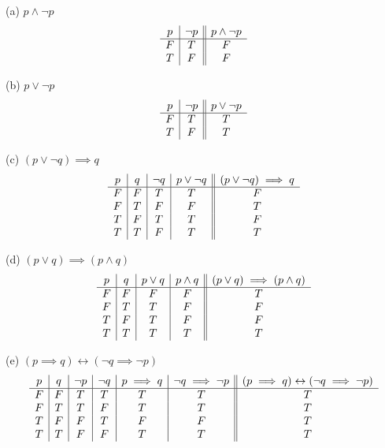 \documentclass[addpoints]{exam}
\begin{document}
\begin{questions}
    \question
    \begin{solution}

        (a) $ p \land \neg p $
        \[ 
        \begin{array}{c | c || c}
            p & \neg p & p \land \neg p \\ 
            \hline
            F & T & F \\ 
            T & F & F
        \end{array}
        \]

        (b) $ p \lor \neg p$
        \[ 
        \begin{array}{c | c || c}
            p & \neg p & p \lor \neg p \\ 
            \hline
            F & T & T \\
            T & F & T
        \end{array}
        \]

        (c) $ (p \lor \neg q) \implies  q$
        \[ 
        \begin{array}{c | c | c | c || c}
            p & q & \neg q & p \lor \neg q & (p \lor \neg q) \implies q \\ 
            \hline
            F & F & T & T & F  \\ 
            F & T & F & F & T  \\ 
            T & F & T & T & F  \\ 
            T & T & F & T & T
        \end{array}
        \]

        (d) $ (p \lor q) \implies (p \land q) $
        \[ 
        \begin{array}{c | c | c | c || c}
            p & q & p \lor q & p \land q & (p \lor q) \implies (p \land q) \\ 
            \hline
            F & F & F & F & T    \\ 
            F & T & T & F & F    \\
            T & F & T & F & F    \\
            T & T & T & T & T
        \end{array}
        \]

        (e) $ (p \implies q) \leftrightarrow (\neg q \implies \neg p) $
        \[ 
        \begin{array}{c | c | c | c | c | c || c}
            p & q & \neg p & \neg q & p \implies q & \neg q \implies \neg p & (p \implies q) \leftrightarrow (\neg q \implies \neg p) \\ 
            \hline
            F & F & T & T & T & T & T      \\ 
            F & T & T & F & T & T & T      \\
            T & F & F & T & F & F & T      \\ 
            T & T & F & F & T & T & T      
        \end{array}
        \]


\end{solution}
\end{questions}
\end{document}
